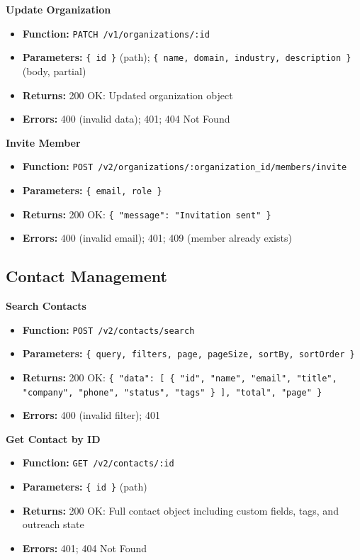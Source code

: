 \documentclass[a4paper]{article}
\begin{document}
\textbf{Update Organization}
\begin{itemize}
  \item \textbf{Function:} \texttt{PATCH /v1/organizations/:id}
  \item \textbf{Parameters:} \texttt{\{ id \}} (path); \texttt{\{ name, domain, industry, description \}} (body, partial)
  \item \textbf{Returns:} 200 OK: Updated organization object
  \item \textbf{Errors:} 400 (invalid data); 401; 404 Not Found
\end{itemize}

\textbf{Invite Member}
\begin{itemize}
  \item \textbf{Function:} \texttt{POST /v2/organizations/:organization\_id/members/invite}
  \item \textbf{Parameters:} \texttt{\{ email, role \}}
  \item \textbf{Returns:} 200 OK: \texttt{\{ "message": "Invitation sent" \}}
  \item \textbf{Errors:} 400 (invalid email); 401; 409 (member already exists)
\end{itemize}

\subsection{Contact Management}

\textbf{Search Contacts}
\begin{itemize}
  \item \textbf{Function:} \texttt{POST /v2/contacts/search}
  \item \textbf{Parameters:} \texttt{\{ query, filters, page, pageSize, sortBy, sortOrder \}}
  \item \textbf{Returns:} 200 OK: \texttt{\{ "data": [ \{ "id", "name", "email", "title", "company", "phone", "status", "tags" \} ], "total", "page" \}}
  \item \textbf{Errors:} 400 (invalid filter); 401
\end{itemize}

\textbf{Get Contact by ID}
\begin{itemize}
  \item \textbf{Function:} \texttt{GET /v2/contacts/:id}
  \item \textbf{Parameters:} \texttt{\{ id \}} (path)
  \item \textbf{Returns:} 200 OK: Full contact object including custom fields, tags, and outreach state
  \item \textbf{Errors:} 401; 404 Not Found
\end{itemize}
\end{document}
